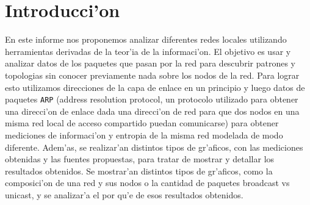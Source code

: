 \section{Introducci'on}
En este informe nos proponemos analizar diferentes redes locales utilizando herramientas derivadas de la
teor'ia de la informaci'on. El objetivo es usar y analizar datos de los paquetes que pasan
por la red para descubrir patrones y topologias sin conocer previamente nada sobre los nodos de la red. Para lograr esto
utilizamos direcciones de la capa de enlace en un principio y luego datos de paquetes \texttt{ARP} (address resolution protocol,
un protocolo  utilizado para obtener una direcci'on de enlace dada una direcci'on de red para que dos nodos en 
una misma red local de acceso compartido puedan comunicarse) para obtener mediciones de informaci'on y entropia de la misma
red modelada de modo diferente. Adem'as, se realizar'an distintos tipos de gr'aficos, con las mediciones obtenidas y las fuentes propuestas,
para tratar de mostrar y detallar los resultados obtenidos. Se mostrar'an distintos tipos de 
gr'aficos, como la composici'on de una red y sus nodos o la cantidad de paquetes broadcast vs unicast,
y se analizar'a el por qu'e de esos resultados obtenidos.


